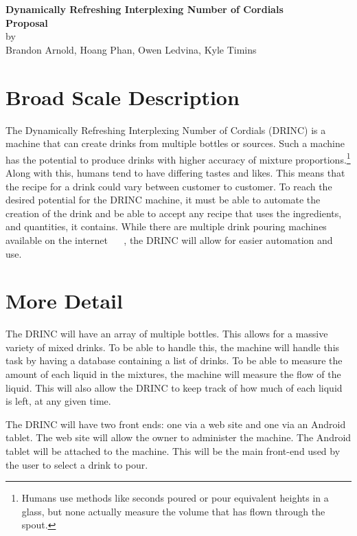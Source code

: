 \documentclass[letterpaper]{article}
\newcommand{\theTitle}{Dynamically Refreshing Interplexing Number of Cordials}
\newcommand{\subTitle}{DRINC}
\newcommand{\fNames}{Brandon Arnold, Hoang Phan, Owen Ledvina, Kyle Timins}
\begin{document}
\thispagestyle{plain}
\begin{center}
{\LARGE \textbf{\theTitle}}\\\vspace{0.5cm}
{\Large \textbf{Proposal}}\\\vspace{0.5cm}
by\\
{\large \fNames}

\end{center}

\section{Broad Scale Description}

The \theTitle{} (\subTitle{}) is a machine that can create drinks from
multiple bottles or sources. Such a machine has the potential to produce
drinks with higher accuracy of mixture proportions.\footnote{Humans use
methods like seconds poured or pour equivalent heights in a glass, but 
none actually measure the volume that has flown through the spout.} Along
with this, humans tend to have differing tastes and likes. This means
that the recipe for a drink could vary between customer to customer.
To reach the desired potential for the \subTitle{} machine, it must be 
able to automate the creation of the drink and be able to accept any recipe
that uses the ingredients, and quantities, it contains. While there are
multiple drink pouring machines available on the internet ~\cite{BaR2D2}
~\cite{Inebriator}, the \subTitle{} will allow for easier automation and
use.


\section{More Detail} %

The \subTitle{} will have an array of multiple bottles. This allows for
a massive variety of mixed drinks. To be able to handle this, the machine
will handle this task by having a database containing a list of drinks. 
To be able to measure the amount of each liquid in the mixtures, the 
machine will measure the flow of the liquid. This will also allow the 
\subTitle{} to keep track of how much of each liquid is left, at any given
time.

The \subTitle{} will have two front ends: one via a web site and one via an
Android tablet. The web site will allow the owner to administer the machine.
The Android tablet will be attached to the machine. This will be the main
front-end used by the user to select a drink to pour.
\end{document}
